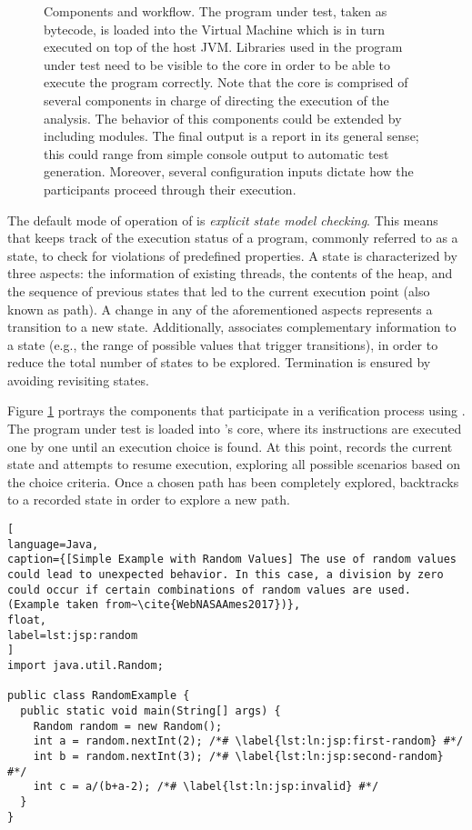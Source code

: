 \begin{figure}[t]
\caption[\jpf{} Components and Workflow]{\jpf{} Components and workflow. The program under test, taken as bytecode, is loaded into the \jpf{} Virtual Machine which is in turn executed on top of the host JVM. Libraries used in the program under test need to be visible to the core in order to be able to execute the program correctly. Note that the core is comprised of several components in charge of directing the execution of the analysis. The behavior of this components could be extended by including modules. The final output is a report in its general sense; this could range from simple console output to automatic test generation. Moreover, several configuration inputs dictate how the participants proceed through their execution.}
\label{fig:jpf:process}
\end{figure}

The default mode of operation of \jpf{} is \textit{explicit state model checking}. This means that \jpf{} keeps track of the execution status of a program, commonly referred to as a state, to check for violations of predefined properties. A state is characterized by three aspects: the information of existing threads, the contents of the heap, and the sequence of previous states that led to the current execution point (also known as path). A change in any of the aforementioned aspects represents a transition to a new state. Additionally, \jpf{} associates complementary information to a state (e.g., the range of possible values that trigger transitions), in order to reduce the total number of states to be explored. Termination is ensured by avoiding revisiting states.

Figure \ref{fig:jpf:process} portrays the components that participate in a verification process using \jpf{}. The program under test is loaded into \jpf{}'s core, where its instructions are executed one by one until an execution choice is found. At this point, \jpf{} records the current state and attempts to resume execution, exploring all possible scenarios based on the choice criteria. Once a chosen path has been completely explored, \jpf{} backtracks to a recorded state in order to explore a new path.

\begin{lstlisting}[
language=Java,
caption={[Simple Example with Random Values] The use of random values could lead to unexpected behavior. In this case, a division by zero could occur if certain combinations of random values are used. (Example taken from~\cite{WebNASAAmes2017})},
float,
label=lst:jsp:random
]
import java.util.Random;

public class RandomExample {
  public static void main(String[] args) {
    Random random = new Random();
    int a = random.nextInt(2); /*# \label{lst:ln:jsp:first-random} #*/
    int b = random.nextInt(3); /*# \label{lst:ln:jsp:second-random} #*/
    int c = a/(b+a-2); /*# \label{lst:ln:jsp:invalid} #*/
  }
}
\end{lstlisting}

